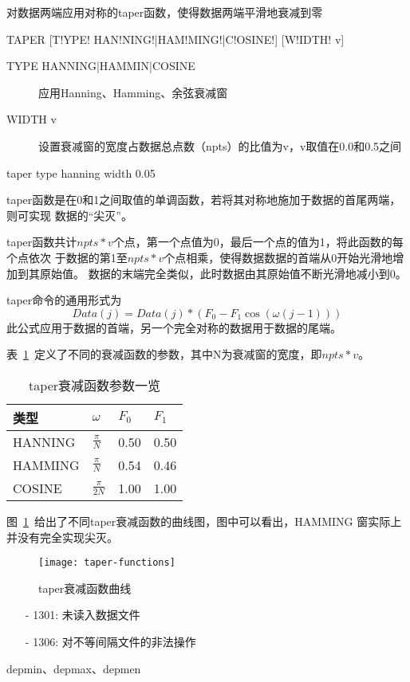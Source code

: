 \label{cmd:taper}

对数据两端应用对称的taper函数，使得数据两端平滑地衰减到零

\begin{SACSTX}
TAPER [T!YPE! HAN!NING!|HAM!MING!|C!OSINE!] [W!IDTH! v]
\end{SACSTX}

\begin{description}
\item [TYPE HANNING|HAMMIN|COSINE] 应用Hanning、Hamming、余弦衰减窗
\item [WIDTH v] 设置衰减窗的宽度占数据总点数（npts）的比值为v，v取值在0.0和0.5之间
\end{description}

\begin{SACDFT}
taper type hanning width 0.05
\end{SACDFT}

taper函数是在0和1之间取值的单调函数，若将其对称地施加于数据的首尾两端，则可实现
数据的``尖灭''。

taper函数共计$npts*v$个点，第一个点值为0，最后一个点的值为1，将此函数的每个点依次
于数据的第1至$npts*v$个点相乘，使得数据数据的首端从0开始光滑地增加到其原始值。
数据的末端完全类似，此时数据由其原始值不断光滑地减小到0。

taper命令的通用形式为
\[
    Data(j) = Data(j)*(F_0 - F_1\cos(\omega(j-1)))
\]
此公式应用于数据的首端，另一个完全对称的数据用于数据的尾端。

表~\ref{table:taper-functions}~定义了不同的衰减函数的参数，其中N为衰减窗的宽度，即$npts*v$。
\begin{table}[ht]
\centering
\caption{taper衰减函数参数一览}
\label{table:taper-functions}
\begin{tabular}{llll}
\toprule
类型 & $\omega$ & $F_0$	& $F_1$	\\
\midrule
HANNING	&	$\frac{\pi}{N}$	&	0.50	&	0.50	\\
HAMMING	&	$\frac{\pi}{N}$	&	0.54	&	0.46	\\
COSINE	&	$\frac{\pi}{2N}$	&	1.00	&	1.00	\\
\bottomrule
\end{tabular}
\end{table}

图~\ref{fig:taper-functions}~给出了不同taper衰减函数的曲线图，图中可以看出，HAMMING
窗实际上并没有完全实现尖灭。
\begin{figure}[!ht]
\centering
\texttt{[image: taper-functions]}
\caption{taper衰减函数曲线}
\label{fig:taper-functions}
\end{figure}

\begin{itemize}
\item[-]1301: 未读入数据文件
\item[-]1306: 对不等间隔文件的非法操作
\end{itemize}

depmin、depmax、depmen
